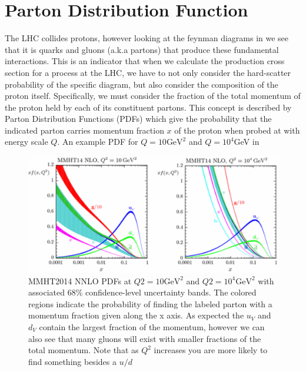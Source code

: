 \section{Parton Distribution Function} \label{sec:higgs:partons}

The LHC collides protons, however looking at the feynman diagrams in
 we see that it is quarks and gluons (a.k.a partons)
that produce these fundamental interactions. This is an indicator that when we
calculate the production cross section for a process at the LHC, we have to not
only consider the hard-scatter probability of the specific diagram, but also
consider the composition of the proton itself.  Specifically, we must consider
the fraction of the total momentum of the proton held by each of its constituent
partons.  This concept is described by Parton Distribution Functions (PDFs)
which give the probability that the indicated parton carries momentum fraction
$x$ of the proton when probed at with energy scale $Q$.  An example PDF for $Q =
10\text{GeV}^2$ and $Q = 10^{4}$GeV in 

\begin{figure}[!htbp]
  \begin{center}
    \includegraphics[width=0.8\linewidth]{figures/higgs/pdf.pdf}
    \caption{ \cite{Harland-Lang2015} MMHT2014 NNLO PDFs at $Q2 = 10\text{GeV}^{2}$ and $Q2
=10^{4}\text{GeV}^{2}$ with associated 68\% confidence-level uncertainty bands.
The colored regions indicate the probability of finding the labeled parton with
a momentum fraction given along the x axis. As expected the $u_V$ and $d_V$
contain the largest fraction of the momentum, however we can also see that many
gluons will exist with smaller fractions of the total momentum. Note that as
$Q^2$ increases you are more likely to find something besides a $u/d$}
    \label{fig:parton_distribution_function}
  \end{center}
\end{figure}
